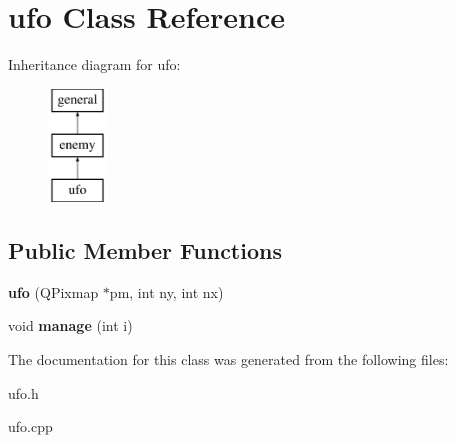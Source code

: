 \hypertarget{classufo}{\section{ufo \-Class \-Reference}
\label{classufo}
}
\-Inheritance diagram for ufo\-:\begin{figure}[H]
\begin{center}
\leavevmode
\includegraphics[height=3.000000cm]{classufo}
\end{center}
\end{figure}
\subsection*{\-Public \-Member \-Functions}
\begin{DoxyCompactItemize}
\item 
\hypertarget{classufo_a1d15634b85153a3a69a5e9d0ea3db20e}{{\bfseries ufo} (\-Q\-Pixmap $\ast$pm, int ny, int nx)}\label{classufo_a1d15634b85153a3a69a5e9d0ea3db20e}

\item 
\hypertarget{classufo_a3d1a29b97be3d1fe676116d9e5a8482c}{void {\bfseries manage} (int i)}\label{classufo_a3d1a29b97be3d1fe676116d9e5a8482c}

\end{DoxyCompactItemize}


\-The documentation for this class was generated from the following files\-:\begin{DoxyCompactItemize}
\item 
ufo.\-h\item 
ufo.\-cpp\end{DoxyCompactItemize}
